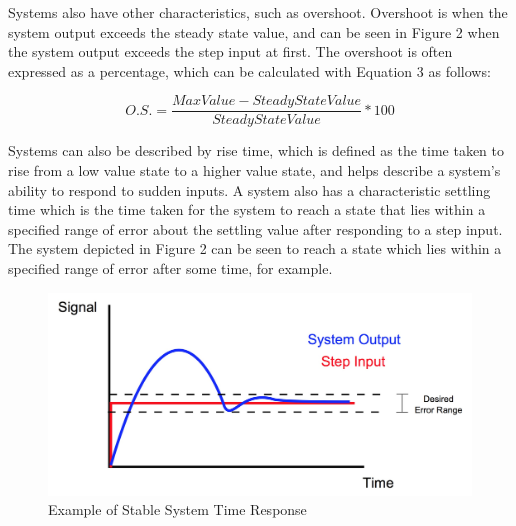 \documentclass[12pt]{article}
\begin{document}
Systems also have other characteristics, such as overshoot. Overshoot is when the system output exceeds the steady state value, and can be seen in Figure 2 when the system output exceeds the step input at first. The overshoot is often expressed as a percentage, which can be calculated with Equation 3 as follows:
\bigskip

\begin{equation}
O.S. = \frac{Max Value - Steady State Value}{Steady State Value}*100
\end{equation}
\bigskip

Systems can also be described by rise time, which is defined as the time taken to rise from a low value state to a higher value state, and helps describe a system's ability to respond to sudden inputs. A system also has a characteristic settling time which is the time taken for the system to reach a state that lies within a specified range of error about the settling value after responding to a step input. The system depicted in Figure 2 can be seen to reach a state which lies within a specified range of error after some time, for example.
\bigskip


\begin{figure}[h!] %
   \centering
   \includegraphics[width=\linewidth]{stable_system.JPG} 
   \caption{Example of Stable System Time Response}
   \label{fig:example}
\end{figure}

\bigskip
\end{document}
